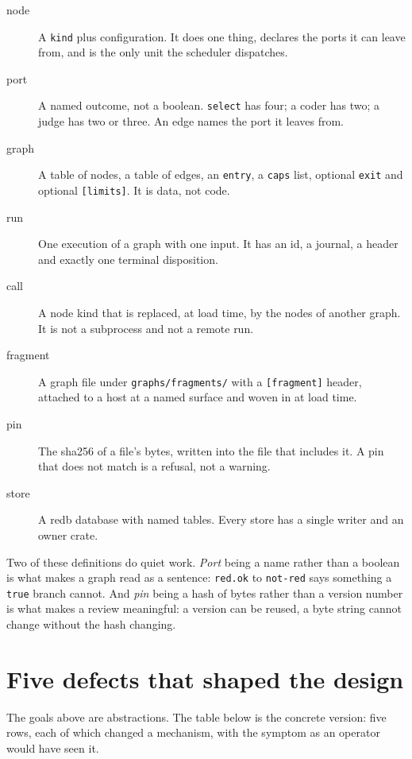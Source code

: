 \begin{description}
	\item[node] A \texttt{kind} plus configuration. It does one thing, declares the ports it can
	leave from, and is the only unit the scheduler dispatches.
	\item[port] A named outcome, not a boolean. \texttt{select} has four; a coder has two; a judge
	has two or three. An edge names the port it leaves from.
	\item[graph] A table of nodes, a table of edges, an \texttt{entry}, a \texttt{caps} list,
	optional \texttt{exit} and optional \texttt{[limits]}. It is data, not code.
	\item[run] One execution of a graph with one input. It has an id, a journal, a header and
	exactly one terminal disposition.
	\item[call] A node kind that is replaced, at load time, by the nodes of another graph. It is not
	a subprocess and not a remote run.
	\item[fragment] A graph file under \texttt{graphs/fragments/} with a \texttt{[fragment]}
	header, attached to a host at a named surface and woven in at load time.
	\item[pin] The sha256 of a file's bytes, written into the file that includes it. A pin that
	does not match is a refusal, not a warning.
	\item[store] A redb database with named tables. Every store has a single writer and an owner
	crate.
\end{description}

Two of these definitions do quiet work. \emph{Port} being a name rather than a boolean is what makes
a graph read as a sentence: \texttt{red.ok} to \texttt{not-red} says something a \texttt{true}
branch cannot. And \emph{pin} being a hash of bytes rather than a version number is what makes a
review meaningful: a version can be reused, a byte string cannot change without the hash changing.

\section{Five defects that shaped the design}

The goals above are abstractions. The table below is the concrete version: five rows, each of which
changed a mechanism, with the symptom as an operator would have seen it.

